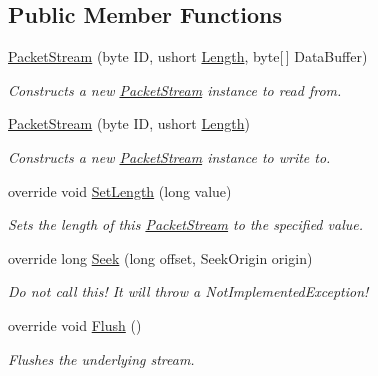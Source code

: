 \subsection*{Public Member Functions}
\begin{DoxyCompactItemize}
\item 
\hyperlink{class_gonzo_net_1_1_packet_stream_abd25c24a889a02982aa297f1bacdcb71}{Packet\+Stream} (byte I\+D, ushort \hyperlink{class_gonzo_net_1_1_packet_stream_a8d15de3e1c877c4e8dc19080b6f6d3ec}{Length}, byte\mbox{[}$\,$\mbox{]} Data\+Buffer)
\begin{DoxyCompactList}\small\item\em Constructs a new \hyperlink{class_gonzo_net_1_1_packet_stream}{Packet\+Stream} instance to read from. \end{DoxyCompactList}\item 
\hyperlink{class_gonzo_net_1_1_packet_stream_a62ed738f0371b77cbe8fd4af914f376e}{Packet\+Stream} (byte I\+D, ushort \hyperlink{class_gonzo_net_1_1_packet_stream_a8d15de3e1c877c4e8dc19080b6f6d3ec}{Length})
\begin{DoxyCompactList}\small\item\em Constructs a new \hyperlink{class_gonzo_net_1_1_packet_stream}{Packet\+Stream} instance to write to. \end{DoxyCompactList}\item 
override void \hyperlink{class_gonzo_net_1_1_packet_stream_a0ec801641051bbc7fbf5c37064d7941a}{Set\+Length} (long value)
\begin{DoxyCompactList}\small\item\em Sets the length of this \hyperlink{class_gonzo_net_1_1_packet_stream}{Packet\+Stream} to the specified value. \end{DoxyCompactList}\item 
override long \hyperlink{class_gonzo_net_1_1_packet_stream_a16c109fbb0368128d743584635190c1f}{Seek} (long offset, Seek\+Origin origin)
\begin{DoxyCompactList}\small\item\em Do not call this! It will throw a Not\+Implemented\+Exception! \end{DoxyCompactList}\item 
override void \hyperlink{class_gonzo_net_1_1_packet_stream_a7bee3afaaed48ba73907605f91eea294}{Flush} ()
\begin{DoxyCompactList}\small\item\em Flushes the underlying stream. \end{DoxyCompactList}\item 

\end{DoxyCompactItemize}
